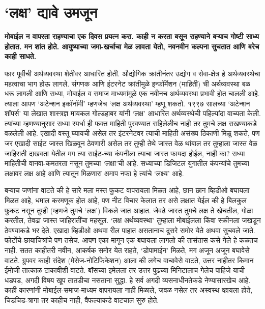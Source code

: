 \chapter{‘लक्ष’ द्यावे उमजून}

{\textbf{मोबाईल न वापरता राहण्याचा एक दिवस प्रयत्न करा. काही न करता बसून राहण्याने बऱ्याच गोष्टी साध्य होतात. मन शांत होते. आयुष्याच्या जमा-खर्चाचा मेळ लावता येतो, नवनवीन कल्पना सुचतात आणि बरेच काही साधते.}}

फार पूर्वीची अर्थव्यवस्था शेतीवर आधारित होती. औद्योगिक क्रांतीनंतर उद्योग व सेवा-क्षेत्र हे अर्थव्यवस्थेचा महत्वाचा भाग होऊ लागले. संगणक आणि इंटरनेट क्रांतीमुळे इन्फॉर्मेशन (माहिती) ची अर्थव्यवस्था बळ धरू लागली आणि सध्या, मोबाईल व समाज माध्यमांमुळे एक नवीनच अर्थव्यवस्था प्रभावी होत चालली आहे. त्याला आपण ‘अटेन्शन इकॉनॉमी’ म्हणजेच ‘लक्ष अर्थव्यवस्था’ म्हणू शकतो. १९९७ सालच्या ‘अटेन्शन शॉपर्स’ या लेखात शास्त्रज्ञ मायकल गोल्डहाबर यांनी ‘लक्ष’ आधारित अर्थव्यस्थेची पहिल्यांदा वाच्यता केली. त्यांच्या म्हणण्यानुसार सध्या स्पर्धा ही फक्त माहिती पुरवण्यात राहिलेलीच नाही तर तुमचे लक्ष राखण्याकडे वळलेली आहे. एखादी वस्तू घ्यायची असेल तर इंटरनेटवर त्याची माहिती असंख्य ठिकाणी मिळू शकते, पण जर एखादी साईट जास्त खिळवून ठेवणारी असेल तर तुम्ही तेथे जास्त वेळ थांबाल तर तुम्हाला जास्त वेळ जाहिराती दाखवता येतील मग त्या साईट-च्या कंपनीला त्याचा जास्त फायदा होईल, नाही का? सध्या माहितीची वानवा-कमतरता नसून तुमच्या ‘लक्षा’ची आहे. सध्याच्या डिजिटल युगातील कंपन्यांचे तुमच्या लक्षावर लक्ष आहे आणि त्यातून मिळणारा अमाप नफा हे त्यांचे ‘लक्ष्य’ आहे.

बऱ्याच जणांना वाटते की हे सारे मला मस्त फुकट वापरायला मिळत आहे, छान छान व्हिडीओ बघायला मिळत आहे, धमाल करमणूक होत आहे, पण नीट विचार केलात तर असे लक्षात येईल की हे बिलकुल फुकट नसून तुम्ही (म्हणजे तुमचे ‘लक्ष’) विकले जात आहात. जेवढे जास्त तुमचे लक्ष ते खेचतील, गोळा करतील, तेवढा जास्त जाहिरातींचा महसूल. ‘लक्ष अर्थव्यवस्था’ तुम्हाला मोबाईलला किंवा स्क्रीनला जखडून ठेवण्याकडे भर देते. एखादा व्हिडीओ अथवा रील पाहात असतानाच दुसरे समोर येते अथवा सुचवले जाते. फोटोंचे-छायाचित्रांचे पण तसेच. आपण एका मागून एक बघायला लागलो की तासंतास कसे गेले हे कळतच नाही. सतत काहीतरी नवीन, आकर्षक समोर येत राहते, ‘डोपामाईन’ मिळते, मग अजून अजून बघावेसे वाटते. ग्रुपवर काही संदेश (मेसेज-नोटिफिकेशन) आला की लगेच वाचावेसे वाटते, उत्तर नाहीतर किमान ईमोजी तात्काळ टाकावीशी वाटते. बॉसच्या इमेलला तर उत्तर पुढच्या मिनिटालाच गेलेच पाहिजे याची धडपड, अगदी विषय खूप तातडीचा नसताना सुद्धा. हे सर्व अगदी व्यसनाधीनतेकडे नेण्यासारखेच आहे. काही कारणांनी मोबाईल-समाज-माध्यम वापरायला नाही मिळाले, जवळ नसेल तर अस्वस्थ व्हायला होते, चिडचिड-त्रागा तर काहीच नाही, वैफल्याकडे वाटचाल सुरु होते.

